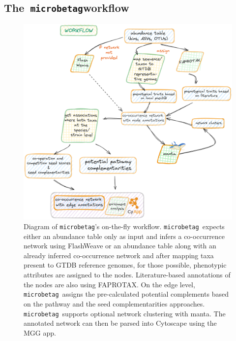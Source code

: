 \documentclass[sn-mathphys,Numbered]{sn-jnl}  %
\theoremstyle{thmstyleone}%
\theoremstyle{thmstyletwo}%
\theoremstyle{thmstylethree}%
\newcommand{\microbetag}{\texttt{microbetag}}
\begin{document}
    \subsection*{The~\microbetag \space  workflow}
    \label{subsec:app}
        \begin{figure}[h!]
            \includegraphics[width=0.9\columnwidth]{figs/microbetag-wf.png}
            \caption{
                Diagram of \microbetag's on-the-fly workflow. 
                \microbetag~\space expects either an abundance table only as input and infers a co-occurrence network using FlashWeave 
                or an abundance table along with an already inferred co-occurrence network 
                and after mapping taxa present to GTDB reference genomes, for those possible, phenotypic attributes are assigned to the nodes. 
                Literature-based annotations of the nodes are also using FAPROTAX.
                On the edge level, \microbetag~\space assigns the pre-calculated potential complements based on the pathway and the seed complementarities approaches. 
                \microbetag~\space supports optional network clustering with manta.
                The annotated network can then be parsed into Cytoscape using the MGG app.
            }
            \label{fig:wf}
        \end{figure}
\end{document}
